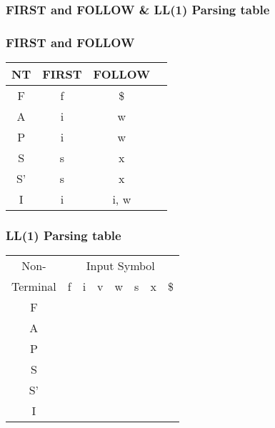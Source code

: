 \documentclass{article}
\begin{document}
\subsubsection{{\ttfamily FIRST} and {\ttfamily FOLLOW} \& LL(1) Parsing table}
\subsubsection*{{\ttfamily FIRST} and {\ttfamily FOLLOW}}
\begin{tabular}{|c|c|c|c|}
\hline
NT & FIRST & FOLLOW \\
\hline
\hline
F  & f & \$ \\
A  & i & w \\
P  & i & w \\
S  & s & x \\
S' & s & x \\
I  & i & i, w \\
\hline
\end{tabular}
\subsubsection*{LL(1) Parsing table}
\begin{tabular}{|c|c|c|c|c|c|c|c|}
\hline
Non- & \multicolumn{7}{c|}{Input Symbol}\\
\cline{2-8}
Terminal & f & i & v & w & s & x & \$ \\
\hline
\hline
F  & & & & & & & \\
\hline
A  & & & & & & & \\
\hline
P  & & & & & & & \\
\hline
S  & & & & & & & \\
\hline
S' & & & & & & & \\
\hline
I  & & & & & & & \\
\hline
\end{tabular}


\printindex
\end{document}
